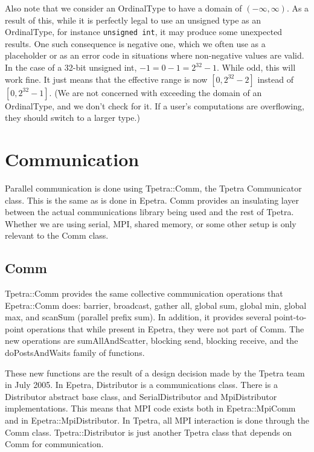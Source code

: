 \documentclass[10pt,relax]{TpetraDesign}
\begin{document}
Also note that we consider an OrdinalType to have a domain of $\left( -\infty, \infty \right)$. As a result of this, while it is perfectly legal to use an unsigned type as an OrdinalType, for instance \texttt{unsigned int}, it may produce some unexpected results. One such consequence is negative one, which we often use as a placeholder or as an error code in situations where non-negative values are valid. In the case of a 32-bit unsigned int, $-1 = 0 - 1 = 2^{32} - 1$. While odd, this will work fine. It just means that the effective range is now $\left[ 0, 2^{32} - 2 \right]$ instead of $\left[ 0, 2^{32} - 1 \right]$. (We are not concerned with exceeding the domain of an OrdinalType, and we don't check for it. If a user's computations are overflowing, they should switch to a larger type.)

%
\section{Communication}
Parallel communication is done using Tpetra::Comm, the Tpetra Communicator class. This is the same as is done in Epetra. Comm provides an insulating layer between the actual communications library being used and the rest of Tpetra. Whether we are using serial, MPI, shared memory, or some other setup is only relevant to the Comm class. 

\subsection{Comm}
Tpetra::Comm provides the same collective communication operations that Epetra::Comm does: barrier, broadcast, gather all, global sum, global min, global max, and scanSum (parallel prefix sum). In addition, it provides several point-to-point operations that while present in Epetra, they were not part of Comm. The new operations are sumAllAndScatter, blocking send, blocking receive, and the doPostsAndWaits family of functions.

These new functions are the result of a design decision made by the Tpetra team in July 2005. In Epetra, Distributor is a communications class. There is a Distributor abstract base class, and SerialDistributor and MpiDistributor implementations. This means that MPI code exists both in Epetra::MpiComm and in Epetra::MpiDistributor. In Tpetra, all MPI interaction is done through the Comm class. Tpetra::Distributor is just another Tpetra class that depends on Comm for communication.
\end{document}
